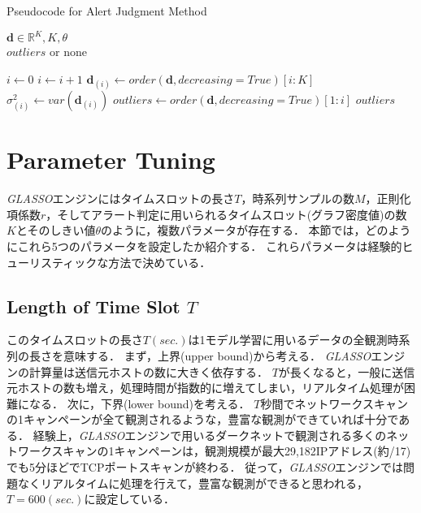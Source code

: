 \documentclass[conference]{IEEEtran}
\begin{document}
\begin{algorithm}[tb]
\caption{Pseudocode for Alert Judgment Method}
\label{alg2}
\begin{algorithmic}[1]
  \REQUIRE $\bm{d}\in\mathbb{R}^{K}, K, \theta$\\
  \ENSURE $outliers$ or none

  \STATE $i \gets 0$
    \STATE $i \gets i + 1$
    \STATE $\bm{d}_{(i)} \gets order(\bm{d}, decreasing=True)[i:K]$
    \STATE $\sigma_{(i)}^2 \gets var(\bm{d}_{(i)})$
      \STATE $outliers \gets order(\bm{d}, decreasing=True)[1:i]$
      \RETURN $outliers$
    \ENDIF
  \ENDWHILE
\end{algorithmic}
\end{algorithm}


\section{Parameter Tuning}
{\it GLASSO}エンジンにはタイムスロットの長さ$T$，時系列サンプルの数$M$，正則化項係数$r$，そしてアラート判定に用いられるタイムスロット(グラフ密度値)の数$K$とそのしきい値$\theta$のように，複数パラメータが存在する．
本節では，どのようにこれら5つのパラメータを設定したか紹介する．
これらパラメータは経験的ヒューリスティックな方法で決めている．

\subsection{Length of Time Slot $T$}
このタイムスロットの長さ$T (sec.)$は1モデル学習に用いるデータの全観測時系列の長さを意味する．
まず，上界(upper bound)から考える．
{\it GLASSO}エンジンの計算量は送信元ホストの数に大きく依存する．
$T$が長くなると，一般に送信元ホストの数も増え，処理時間が指数的に増えてしまい，リアルタイム処理が困難になる．
次に，下界(lower bound)を考える．
$T$秒間でネットワークスキャンの1キャンペーンが全て観測されるような，豊富な観測ができていれば十分である．
経験上，{\it GLASSO}エンジンで用いるダークネットで観測される多くのネットワークスキャンの1キャンペーンは，観測規模が最大29,182IPアドレス(約/17)でも5分ほどでTCPポートスキャンが終わる．
従って，{\it GLASSO}エンジンでは問題なくリアルタイムに処理を行えて，豊富な観測ができると思われる，$T=600 (sec.)$に設定している．
\end{document}
